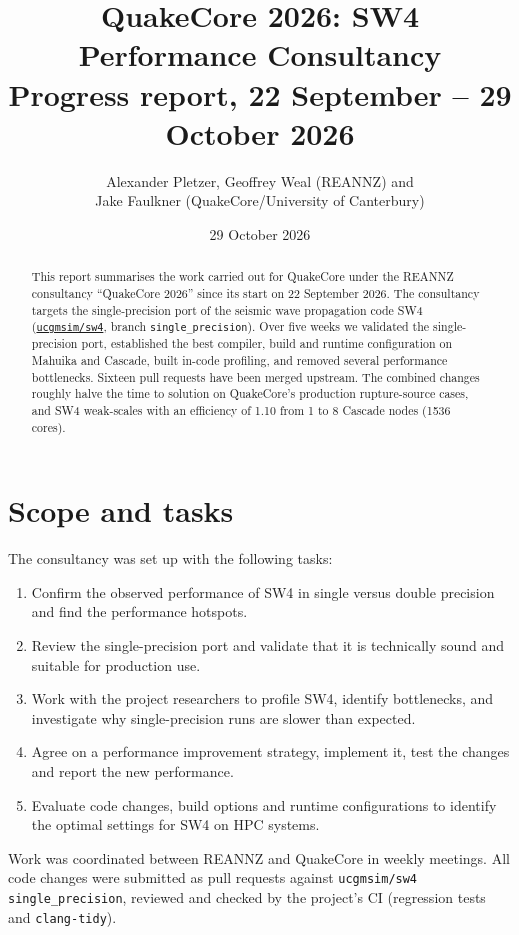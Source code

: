 \documentclass[11pt,a4paper]{article}
\title{QuakeCore 2026: SW4 Performance Consultancy\\[0.3em]
       \large Progress report, 22 September -- 29 October 2026}
\author{Alexander Pletzer, Geoffrey Weal (REANNZ) and\\
        Jake Faulkner (QuakeCore/University of Canterbury)}
\date{29 October 2026}
\newcommand{\code}[1]{\texttt{#1}}
\begin{document}
\maketitle

\begin{abstract}
This report summarises the work carried out for QuakeCore under the REANNZ
consultancy ``QuakeCore 2026'' since its start on 22 September 2026. The
consultancy targets the single-precision port of the seismic wave propagation
code SW4 (\href{https://github.com/ucgmsim/sw4}{\code{ucgmsim/sw4}}, branch
\code{single\_precision}). Over five weeks we validated the single-precision
port, established the best compiler, build and runtime configuration on
Mahuika and Cascade, built in-code profiling, and removed several performance
bottlenecks. Sixteen pull requests have been merged upstream. The combined
changes roughly halve the time to solution on QuakeCore's production
rupture-source cases, and SW4 weak-scales with an efficiency of
1.10 from 1 to 8 Cascade nodes (1536 cores).
\end{abstract}

\section{Scope and tasks}

The consultancy was set up with the following tasks:
\begin{enumerate}[itemsep=0pt]
  \item Confirm the observed performance of SW4 in single versus double
        precision and find the performance hotspots.
  \item Review the single-precision port and validate that it is technically
        sound and suitable for production use.
  \item Work with the project researchers to profile SW4, identify bottlenecks,
        and investigate why single-precision runs are slower than expected.
  \item Agree on a performance improvement strategy, implement it, test the
        changes and report the new performance.
  \item Evaluate code changes, build options and runtime configurations to
        identify the optimal settings for SW4 on HPC systems.
\end{enumerate}
Work was coordinated between REANNZ and QuakeCore in weekly meetings. All code
changes were submitted as pull requests against \code{ucgmsim/sw4}
\code{single\_precision}, reviewed and checked by the project's CI
(regression tests and \code{clang-tidy}).
\end{document}
